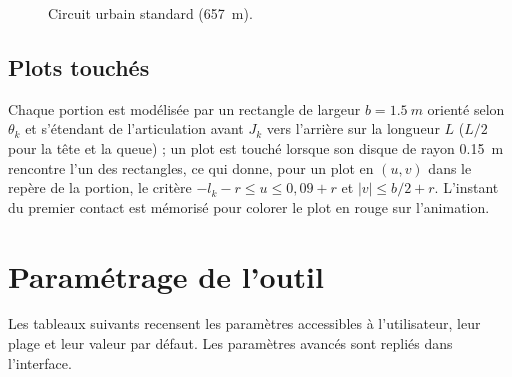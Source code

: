 \documentclass[11pt,a4paper]{article}
\begin{document}
\begin{figure}[H]\centering
{}
\caption{Circuit urbain standard (\SI{657}{m}).}\label{fig:urbain}
\end{figure}

\subsection{Plots touchés}
Chaque portion est modélisée par un rectangle de largeur $b=\SI{1,5}{m}$ orienté selon $\theta_k$ et s'étendant de l'articulation avant $J_k$ vers l'arrière sur la longueur $L$ ($L/2$ pour la tête et la queue) ; un plot est touché lorsque son disque de rayon \SI{0,15}{m} rencontre l'un des rectangles, ce qui donne, pour un plot en $(u,v)$ dans le repère de la portion, le critère $-l_k-r\le u\le0{,}09+r$ et $|v|\le b/2+r$. L'instant du premier contact est mémorisé pour colorer le plot en rouge sur l'animation.

\section{Paramétrage de l'outil}
Les tableaux suivants recensent les paramètres accessibles à l'utilisateur, leur plage et leur valeur par défaut. Les paramètres avancés sont repliés dans l'interface.
\end{document}
